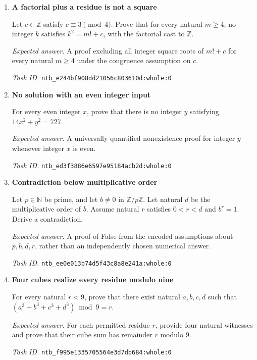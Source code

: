 \documentclass[11pt]{article}
\newcommand{\pth}[1]{\nolinkurl{#1}}
\begin{document}
\begin{enumerate}[label={DEV \arabic*.},leftmargin=4.5em,itemsep=1em]
\emph{Expected answer.} A proof of both nonemptiness and $\operatorname{ofDigits}_{10}(\operatorname{digits}_{10}(nb))\le2nb^2$.

\emph{Task ID.} \pth{ntb_d6d6dd394cac5461186aa8d4:whole:0}

\item \textbf{A factorial plus a residue is not a square}\label{qn:dev:31}

Let $c\in\mathbb Z$ satisfy $c\equiv3\pmod4$. Prove that for every natural $m\ge4$, no integer $k$ satisfies $k^2=m!+c$, with the factorial cast to $\mathbb Z$.

\emph{Expected answer.} A proof excluding all integer square roots of $m!+c$ for every natural $m\ge4$ under the congruence assumption on $c$.

\emph{Task ID.} \pth{ntb_e244bf908dd21056c803610d:whole:0}

\item \textbf{No solution with an even integer input}\label{qn:dev:32}

For every even integer $x$, prove that there is no integer $y$ satisfying $14x^2+y^2=727$.

\emph{Expected answer.} A universally quantified nonexistence proof for integer $y$ whenever integer $x$ is even.

\emph{Task ID.} \pth{ntb_ed3f3886e6597e95184acb2d:whole:0}

\item \textbf{Contradiction below multiplicative order}\label{qn:dev:33}

Let $p\in\mathbb N$ be prime, and let $b\ne0$ in $\mathbb Z/p\mathbb Z$. Let natural $d$ be the multiplicative order of $b$. Assume natural $r$ satisfies $0<r<d$ and $b^r=1$. Derive a contradiction.

\emph{Expected answer.} A proof of False from the encoded assumptions about $p,b,d,r$, rather than an independently chosen numerical answer.

\emph{Task ID.} \pth{ntb_ee0e013b74d5f43c8a8e241a:whole:0}

\item \textbf{Four cubes realize every residue modulo nine}\label{qn:dev:34}

For every natural $r<9$, prove that there exist natural $a,b,c,d$ such that $(a^3+b^3+c^3+d^3)\bmod9=r$.

\emph{Expected answer.} For each permitted residue $r$, provide four natural witnesses and prove that their cube sum has remainder $r$ modulo $9$.

\emph{Task ID.} \pth{ntb_f995e1335705564e3d7db684:whole:0}

\end{enumerate}
\end{document}
